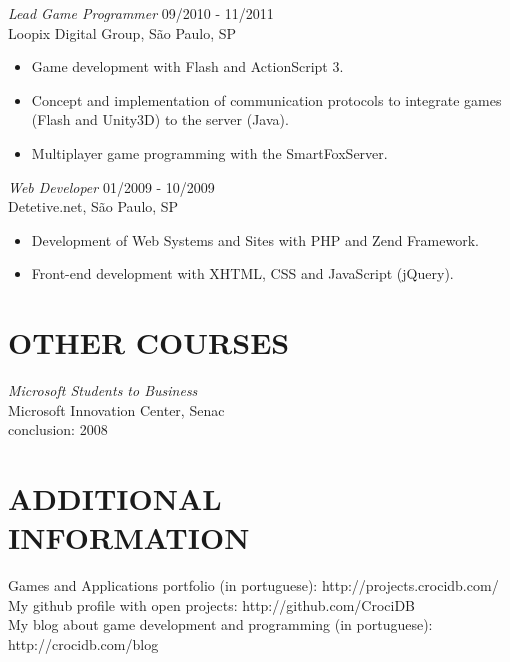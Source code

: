 \documentclass[line,margin]{res}
\begin{document}
\begin{resume}
                 {\sl Lead Game Programmer} \hfill 09/2010 - 11/2011 \\
                Loopix Digital Group, São Paulo, SP
                 \begin{itemize}  \itemsep -2pt %
                 \item Game development with Flash and ActionScript 3.
                 \item Concept and implementation of communication protocols to integrate games (Flash and Unity3D) to the server (Java).
                 \item Multiplayer game programming with the SmartFoxServer.
                 \end{itemize}
 
                {\sl Web Developer} \hfill 01/2009 - 10/2009 \\
                Detetive.net, São Paulo, SP
                 \begin{itemize}  \itemsep -2pt %
                 \item Development of Web Systems and Sites with PHP and Zend Framework.
                 \item Front-end development with XHTML, CSS and JavaScript (jQuery).
                 \end{itemize} 

\section{OTHER COURSES}             
           {\sl Microsoft Students to Business} \\
                Microsoft Innovation Center, Senac \\
                conclusion: 2008 


\section{ADDITIONAL \\ INFORMATION}             
            Games and Applications portfolio (in portuguese): http://projects.crocidb.com/ \\
            My github profile with open projects: http://github.com/CrociDB \\
            My blog about game development and programming (in portuguese): http://crocidb.com/blog
 

\end{resume}
\end{document}
